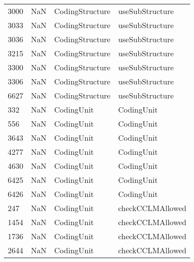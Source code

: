 \begin{tabular}{llll}
3000 &                   NaN &            CodingStructure &                           useSubStructure \\
3033 &                   NaN &            CodingStructure &                           useSubStructure \\
3036 &                   NaN &            CodingStructure &                           useSubStructure \\
3215 &                   NaN &            CodingStructure &                           useSubStructure \\
3300 &                   NaN &            CodingStructure &                           useSubStructure \\
3306 &                   NaN &            CodingStructure &                           useSubStructure \\
6627 &                   NaN &            CodingStructure &                           useSubStructure \\
332  &                   NaN &                 CodingUnit &                                CodingUnit \\
556  &                   NaN &                 CodingUnit &                                CodingUnit \\
3643 &                   NaN &                 CodingUnit &                                CodingUnit \\
4277 &                   NaN &                 CodingUnit &                                CodingUnit \\
4630 &                   NaN &                 CodingUnit &                                CodingUnit \\
6425 &                   NaN &                 CodingUnit &                                CodingUnit \\
6426 &                   NaN &                 CodingUnit &                                CodingUnit \\
247  &                   NaN &                 CodingUnit &                          checkCCLMAllowed \\
1454 &                   NaN &                 CodingUnit &                          checkCCLMAllowed \\
1736 &                   NaN &                 CodingUnit &                          checkCCLMAllowed \\
2644 &                   NaN &                 CodingUnit &                          checkCCLMAllowed \\

\end{tabular}

